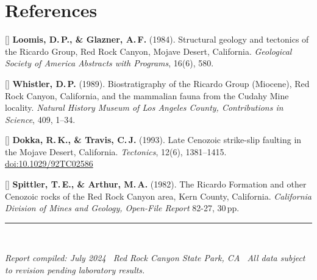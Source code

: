 \section{References}

{\setlength{\parskip}{4pt}\setlength{\parindent}{-16pt}\leftskip=16pt\raggedright

[\theequation\label{Loomis1984}]
\textbf{Loomis, D.\,P., \& Glazner, A.\,F.} (1984).
Structural geology and tectonics of the Ricardo Group,
Red Rock Canyon, Mojave Desert, California.
\textit{Geological Society of America Abstracts with Programs}, 16(6), 580.

[\theequation\label{Whistler1989}]
\textbf{Whistler, D.\,P.} (1989).
Biostratigraphy of the Ricardo Group (Miocene), Red Rock Canyon,
California, and the mammalian fauna from the Cudahy Mine locality.
\textit{Natural History Museum of Los Angeles County,
Contributions in Science}, 409, 1--34.

[\theequation\label{Dokka1993}]
\textbf{Dokka, R.\,K., \& Travis, C.\,J.} (1993).
Late Cenozoic strike-slip faulting in the Mojave Desert, California.
\textit{Tectonics}, 12(6), 1381--1415.
\href{https://doi.org/10.1029/92TC02586}{doi:10.1029/92TC02586}

[\theequation\label{Spittler1982}]
\textbf{Spittler, T.\,E., \& Arthur, M.\,A.} (1982).
The Ricardo Formation and other Cenozoic rocks of the Red Rock Canyon area,
Kern County, California.
\textit{California Division of Mines and Geology, Open-File Report} 82-27, 30\,pp.

}

\vspace{8pt}
{\color{terra}\rule{\linewidth}{0.4pt}}\\[3pt]
{\centering\small\color{stone}\itshape
Report compiled: July 2024 \textperiodcentered\
Red Rock Canyon State Park, CA \textperiodcentered\
All data subject to revision pending laboratory results.\par}
